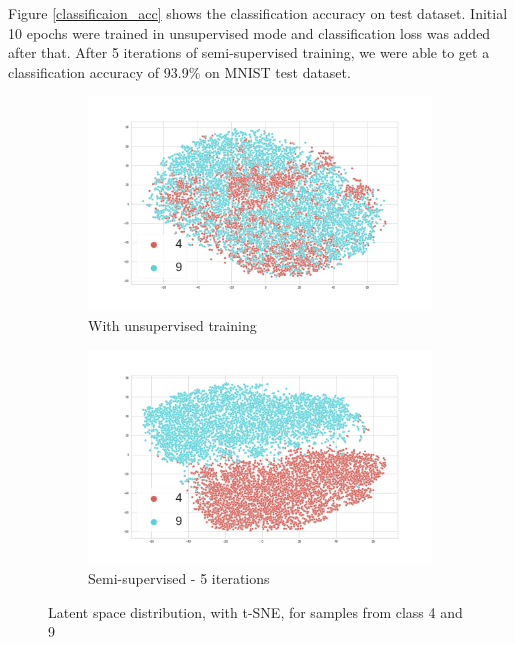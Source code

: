 \documentclass[runningheads]{llncs}
\begin{document}
Figure \ref{classificaion_acc} shows the  classification accuracy on test dataset.
Initial 10 epochs were trained in unsupervised mode and classification loss was added after that.
After 5 iterations of semi-supervised training, we were able to get a classification accuracy of 93.9\% on MNIST test dataset.

\begin{figure}[!t]
\centering
\begin{subfigure}[t]{.45\textwidth}
  \centering
  \includegraphics[width=0.9\linewidth]{images/tsne_4_9_unsup.jpg}
  \caption{With unsupervised training}
  \label{tsne_un_4_9}
\end{subfigure}\hfill
\begin{subfigure}[t]{.45\textwidth}
  \centering
  \includegraphics[width=0.9\linewidth]{tsne_4_9_semi.jpg}
  \caption{Semi-supervised - 5 iterations}
  \label{tsne_semi_4_9}
\end{subfigure}
\caption{Latent space distribution, with t-SNE, for samples from class 4 and 9}
\label{tsne_4_9}
\end{figure}
\end{document}
